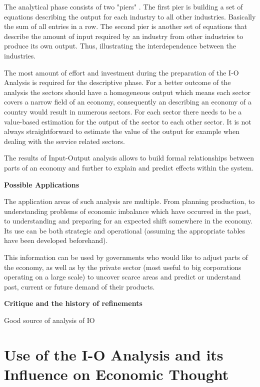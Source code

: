 \documentclass[12pt,a4paper]{scrartcl}
\begin{document}
	The analytical phase consists of two "piers" . The first pier is building a set of equations describing the output for each industry to all other industries. Basically the sum of all entries in a row. The second pier is another set of equations that describe the amount of input required by an industry from other industries to produce its own output. Thus, illustrating the interdependence between the industries.
	
	The most amount of effort and investment during the preparation of the I-O Analysis is required for the descriptive phase. For a better outcome of the analysis the sectors should have a homogeneous output which means each sector covers a narrow field of an economy, consequently an describing an economy of a country would result in numerous sectors. For each sector there needs to be a value-based estimation for the output of the sector to each other sector. It is not always straightforward to estimate the value of the output for example when dealing with the service related sectors.
	
	The results of Input-Output analysis allows to build formal relationships between parts of an economy and further to explain and predict effects within the system. \cite[]{InvestopediaIO} \cite[pp.137-138]{christ1955review}
	
	\textbf{Possible Applications}
	
	The application areas of such analysis are multiple. From planning production, to understanding problems of economic imbalance which have occurred in the past, to understanding and preparing for an expected shift somewhere in the economy. Its use can be both strategic and operational (assuming the appropriate tables have been developed beforehand).
	
	This information can be used by governments who would like to adjust parts of the economy, as well as by the private sector (most useful to big corporations operating on a large scale) to uncover scarce areas and predict or understand past, current or future demand of their products.
	
	\textbf{Critique and the history of refinements}
	
	Good source of analysis of IO \cite{christ1955review}
	
	\section{Use of the I-O Analysis and its Influence on Economic Thought}  \label{contribution}
	
\end{document}
